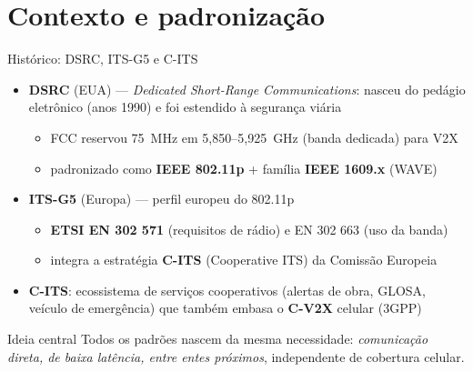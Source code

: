 \documentclass[aspectratio=169,11pt]{beamer}
\begin{document}
\section{Contexto e padronização}

\begin{frame}{Histórico: DSRC, ITS-G5 e C-ITS}
  \begin{itemize}
    \item \textbf{DSRC} (EUA) --- \emph{Dedicated Short-Range Communications}: nasceu do pedágio eletrônico (anos 1990) e foi estendido à segurança viária
      \begin{itemize}
        \item FCC reservou 75~MHz em 5,850--5,925~GHz (banda dedicada) para V2X
        \item padronizado como \textbf{IEEE 802.11p} + família \textbf{IEEE 1609.x} (WAVE)
      \end{itemize}
    \item \textbf{ITS-G5} (Europa) --- perfil europeu do 802.11p
      \begin{itemize}
        \item \textbf{ETSI EN 302 571} (requisitos de rádio) e EN 302 663 (uso da banda)
        \item integra a estratégia \textbf{C-ITS} (Cooperative ITS) da Comissão Europeia
      \end{itemize}
    \item \textbf{C-ITS}: ecossistema de serviços cooperativos (alertas de obra, GLOSA, veículo de emergência) que também embasa o \textbf{C-V2X} celular (3GPP)
  \end{itemize}
  \pause
  \begin{exampleblock}{Ideia central}
    Todos os padrões nascem da mesma necessidade: \emph{comunicação direta, de baixa latência, entre entes próximos}, independente de cobertura celular.
  \end{exampleblock}
\end{frame}
\end{document}
